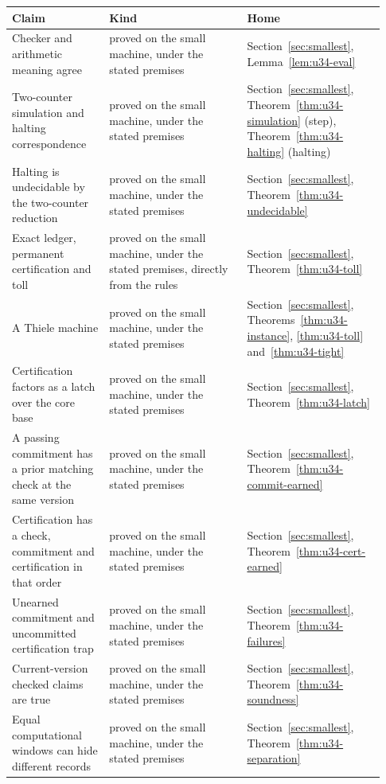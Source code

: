 \documentclass[11pt,twoside]{article}
\theoremstyle{thielethm}
\theoremstyle{thieledef}
\theoremstyle{thieledef}
\theoremstyle{thieledef}
\theoremstyle{thielethm}
\theoremstyle{thieleobs}
\theoremstyle{thielethm}
\begin{document}
\begingroup\small
\begin{longtable}{@{}>{\raggedright\arraybackslash}p{0.242\linewidth}>{\raggedright\arraybackslash}p{0.344\linewidth}>{\raggedright\arraybackslash}p{0.344\linewidth}@{}}
\toprule
\textbf{Claim} & \textbf{Kind} & \textbf{Home} \\
\midrule
\endhead
\bottomrule
\endlastfoot
Checker and arithmetic meaning agree & proved on the small machine, under the stated premises & Section~\ref{sec:smallest}, Lemma~\ref{lem:u34-eval} \\
Two-counter simulation and halting correspondence & proved on the small machine, under the stated premises & Section~\ref{sec:smallest}, Theorem~\ref{thm:u34-simulation} (step), Theorem~\ref{thm:u34-halting} (halting) \\
Halting is undecidable by the two-counter reduction & proved on the small machine, under the stated premises & Section~\ref{sec:smallest}, Theorem~\ref{thm:u34-undecidable} \\
Exact ledger, permanent certification and toll & proved on the small machine, under the stated premises, directly from the rules & Section~\ref{sec:smallest}, Theorem~\ref{thm:u34-toll} \\
A Thiele machine & proved on the small machine, under the stated premises & Section~\ref{sec:smallest}, Theorems~\ref{thm:u34-instance}, \ref{thm:u34-toll} and~\ref{thm:u34-tight} \\
Certification factors as a latch over the core base & proved on the small machine, under the stated premises & Section~\ref{sec:smallest}, Theorem~\ref{thm:u34-latch} \\
A passing commitment has a prior matching check at the same version & proved on the small machine, under the stated premises & Section~\ref{sec:smallest}, Theorem~\ref{thm:u34-commit-earned} \\
Certification has a check, commitment and certification in that order & proved on the small machine, under the stated premises & Section~\ref{sec:smallest}, Theorem~\ref{thm:u34-cert-earned} \\
Unearned commitment and uncommitted certification trap & proved on the small machine, under the stated premises & Section~\ref{sec:smallest}, Theorem~\ref{thm:u34-failures} \\
Current-version checked claims are true & proved on the small machine, under the stated premises & Section~\ref{sec:smallest}, Theorem~\ref{thm:u34-soundness} \\
Equal computational windows can hide different records & proved on the small machine, under the stated premises & Section~\ref{sec:smallest}, Theorem~\ref{thm:u34-separation} \\

\end{longtable}
\end{document}

